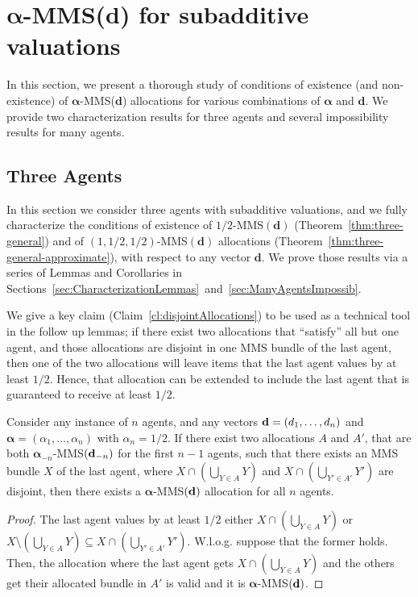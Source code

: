 \section{$\boldsymbol{\alpha}$-MMS($\mathbf{d}$) for subadditive valuations}
\label{sec:Reductions}
In this section, we present a thorough study of conditions of existence (and non-existence) of $\boldsymbol{\alpha}$-MMS($\mathbf{d}$) allocations for various combinations of $\boldsymbol{\alpha}$ and $\mathbf{d}$. We provide two characterization results for three agents and several impossibility results for many agents. 

\subsection{Three Agents}
 In this section we consider three agents with subadditive valuations, and we fully characterize the conditions of existence of $1/2$-MMS$(\mathbf{d})$  (Theorem~\ref{thm:three-general}) and of $(1,1/2,1/2)$-MMS$(\mathbf{d})$ allocations (Theorem~\ref{thm:three-general-approximate}), with respect to any vector $\mathbf{d}$. We prove those results via a series of Lemmas and Corollaries in Sections~\ref{sec:CharacterizationLemmas}~and~\ref{sec:ManyAgentsImpossib}.

 We give a key claim (Claim~\ref{cl:disjointAllocations}) to be used as a technical tool in the follow up lemmas; if there exist two allocations that ``satisfy'' all but one agent, and those allocations are disjoint in one MMS bundle of the last agent, then one of the two allocations will leave items that the last agent values by at least $1/2$. Hence, that allocation can be extended to include the last agent that is guaranteed to receive at least $1/2$. 

 \begin{claim}
\label{cl:disjointAllocations}
    Consider any instance of $n$ agents, and any vectors ${\bf d}=(d_1,\ldots, d_n)$ and $\boldsymbol{\alpha}=(\alpha_1,\ldots,\alpha_n)$ with $\alpha_n =1/2$. If there exist two  allocations $A$ and $A'$, that are both $\boldsymbol{\alpha}_{-n}$-MMS$({\bf d}_{-n})$ for the first $n-1$ agents, such that there exists an MMS bundle $X$ of the last agent, where $X \cap \left(\bigcup_{Y\in A}Y\right)$ and $X \cap \left(\bigcup_{Y'\in A'}Y'\right)$ are disjoint,  
    then there exists a $\boldsymbol{\alpha}$-MMS$(\bf d)$ allocation for all $n$ agents.
\end{claim}


    
\begin{proof}
    The last agent values by at least $1/2$ either $X\cap \left(\bigcup_{Y\in A}Y\right)$ or $X\setminus \left(\bigcup_{Y\in A}Y\right) \subseteq X\cap \left(\bigcup_{Y'\in A'}Y'\right)$. W.l.o.g. suppose that the former holds. Then, the allocation where the last agent gets $X\cap \left(\bigcup_{Y\in A}Y\right) $ and the others get their allocated bundle in $A'$ is valid and it is $\boldsymbol{\alpha}$-MMS$(\bf d)$.
\end{proof}
 



